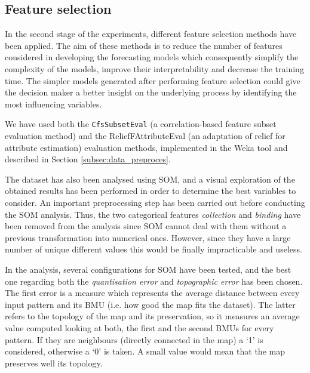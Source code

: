 \documentclass[a4paper,10pt,twocolumn,preprint,3p]{elsarticle}
\begin{document}

\subsection{Feature selection}
\label{subsec:feature_selection}

In the second stage of the experiments, different feature selection methods have been applied. The aim of these methods is to reduce the number of features considered in developing the forecasting models which consequently simplify the complexity of the models, improve their interpretability and decrease the training time. The simpler models generated after performing feature selection could give the decision maker a better insight on the underlying process by identifying the most influencing variables. 
  
We have used both the {\tt CfsSubsetEval} \cite{Hall1998} (a correlation-based feature subset evaluation method) and the ReliefFAttributeEval \cite{RobnikSikonja1997} (an adaptation of relief for attribute estimation) evaluation methods, implemented in the Weka tool and described in Section \ref{subsec:data_preproces}.

The dataset has also been analysed using SOM, and a visual exploration of the obtained results has been performed in order to determine the best variables to consider.
An important preprocessing step has been carried out before conducting the SOM analysis. Thus, the two categorical features \emph{collection} and \emph{binding} have been removed from the analysis since SOM cannot deal with them without a previous transformation into numerical ones. However, since they have a large number of unique different values this would be finally impracticable and useless. 

In the analysis, several configurations for SOM have been tested, and the best one regarding both the \textit{quantisation error} and \textit{topographic error} has been chosen. The first error is a measure which represents the average distance between every input pattern and its BMU (i.e. how good the map fits the dataset). The latter refers to the topology of the map and its preservation, so it measures an average value computed looking at both, the first and the second BMUs for every pattern. If they are neighbours (directly connected in the map) a `1' is considered, otherwise a `0' is taken. A small value would mean that the map preserves well its topology.
\end{document}
